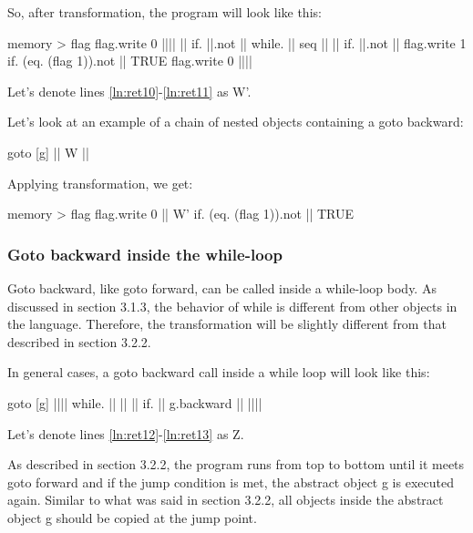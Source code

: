 \documentclass[sigplan,review,11pt,nonacm,natbib=false]{acmart}
\begin{document}
So, after transformation, the program will look like this:
\begin{ffcode}
memory > flag
flag.write 0
|||$\label{ln:ret10}$|
  ||
  if.
    ||.not
    ||
    while.
      ||
      seq
        ||
          ||
          if.
            ||.not
            ||
            flag.write 1
          if.
            (eq. (flag 1)).not
            ||
            TRUE
        flag.write 0
  |||$\label{ln:ret11}$|

      
        
\end{ffcode}

Let's denote lines \ref{ln:ret10}-\ref{ln:ret11} as W'.

Let's look at an example of a chain of nested objects containing a goto backward:

\begin{ffcode}
goto
  [g]
    ||
      W
      ||
\end{ffcode}

Applying transformation, we get:
\begin{ffcode}
memory > flag
flag.write 0
||
  W'
  if.
    (eq. (flag 1)).not
    ||
    TRUE
\end{ffcode}


\subsubsection{Goto backward inside the while-loop}
Goto backward, like goto forward, can be called inside a while-loop body.
As discussed in section 3.1.3, the behavior of while is different from other objects in the language. Therefore, the transformation will be slightly different from that described in section 3.2.2.

In general cases, a goto backward call inside a while loop will look like this:

\begin{ffcode}
goto
  [g]
    |||$\label{ln:ret12}$|
      while.
        ||
        ||
          ||
          if.
            ||
            g.backward
            ||
          |||$\label{ln:ret13}$|
        
\end{ffcode}

Let's denote lines \ref{ln:ret12}-\ref{ln:ret13} as Z.

As described in section 3.2.2, the program runs from top to bottom until it meets goto forward and if the jump condition is met, the abstract object g is executed again.
Similar to what was said in section 3.2.2, all objects inside the abstract object g should be copied at the jump point.
\end{document}
